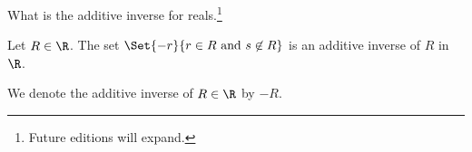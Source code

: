 

What is the additive inverse for reals.\footnote{Future editions will expand.}


\begin{proposition}
Let $R \in \R$.
  The set $\Set{-r}{r \in R \text{ and } s \not\in R}$ is an additive inverse of $R$ in $\R$.
\end{proposition}


We denote the additive inverse of $R \in \R$ by $-R$.

\blankpage
